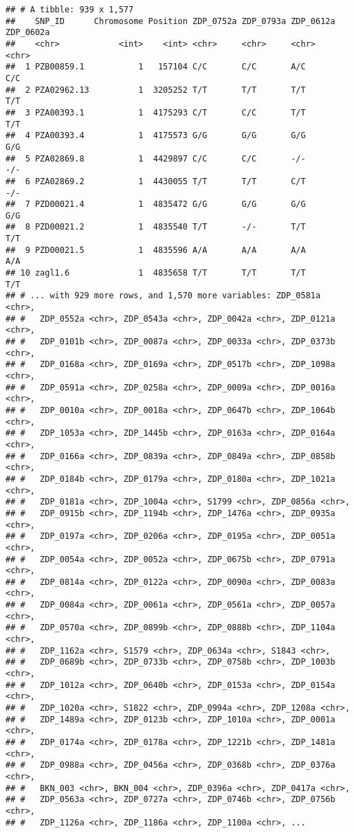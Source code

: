 \documentclass[]{article}
\begin{document}
\begin{verbatim}
## # A tibble: 939 x 1,577
##    SNP_ID      Chromosome Position ZDP_0752a ZDP_0793a ZDP_0612a ZDP_0602a
##    <chr>            <int>    <int> <chr>     <chr>     <chr>     <chr>    
##  1 PZB00859.1           1   157104 C/C       C/C       A/C       C/C      
##  2 PZA02962.13          1  3205252 T/T       T/T       T/T       T/T      
##  3 PZA00393.1           1  4175293 C/T       C/C       T/T       T/T      
##  4 PZA00393.4           1  4175573 G/G       G/G       G/G       G/G      
##  5 PZA02869.8           1  4429897 C/C       C/C       -/-       -/-      
##  6 PZA02869.2           1  4430055 T/T       T/T       C/T       -/-      
##  7 PZD00021.4           1  4835472 G/G       G/G       G/G       G/G      
##  8 PZD00021.2           1  4835540 T/T       -/-       T/T       T/T      
##  9 PZD00021.5           1  4835596 A/A       A/A       A/A       A/A      
## 10 zagl1.6              1  4835658 T/T       T/T       T/T       T/T      
## # ... with 929 more rows, and 1,570 more variables: ZDP_0581a <chr>,
## #   ZDP_0552a <chr>, ZDP_0543a <chr>, ZDP_0042a <chr>, ZDP_0121a <chr>,
## #   ZDP_0101b <chr>, ZDP_0087a <chr>, ZDP_0033a <chr>, ZDP_0373b <chr>,
## #   ZDP_0168a <chr>, ZDP_0169a <chr>, ZDP_0517b <chr>, ZDP_1098a <chr>,
## #   ZDP_0591a <chr>, ZDP_0258a <chr>, ZDP_0009a <chr>, ZDP_0016a <chr>,
## #   ZDP_0010a <chr>, ZDP_0018a <chr>, ZDP_0647b <chr>, ZDP_1064b <chr>,
## #   ZDP_1053a <chr>, ZDP_1445b <chr>, ZDP_0163a <chr>, ZDP_0164a <chr>,
## #   ZDP_0166a <chr>, ZDP_0839a <chr>, ZDP_0849a <chr>, ZDP_0858b <chr>,
## #   ZDP_0184b <chr>, ZDP_0179a <chr>, ZDP_0180a <chr>, ZDP_1021a <chr>,
## #   ZDP_0181a <chr>, ZDP_1004a <chr>, S1799 <chr>, ZDP_0856a <chr>,
## #   ZDP_0915b <chr>, ZDP_1194b <chr>, ZDP_1476a <chr>, ZDP_0935a <chr>,
## #   ZDP_0197a <chr>, ZDP_0206a <chr>, ZDP_0195a <chr>, ZDP_0051a <chr>,
## #   ZDP_0054a <chr>, ZDP_0052a <chr>, ZDP_0675b <chr>, ZDP_0791a <chr>,
## #   ZDP_0814a <chr>, ZDP_0122a <chr>, ZDP_0090a <chr>, ZDP_0083a <chr>,
## #   ZDP_0084a <chr>, ZDP_0061a <chr>, ZDP_0561a <chr>, ZDP_0057a <chr>,
## #   ZDP_0570a <chr>, ZDP_0899b <chr>, ZDP_0888b <chr>, ZDP_1104a <chr>,
## #   ZDP_1162a <chr>, S1579 <chr>, ZDP_0634a <chr>, S1843 <chr>,
## #   ZDP_0689b <chr>, ZDP_0733b <chr>, ZDP_0758b <chr>, ZDP_1003b <chr>,
## #   ZDP_1012a <chr>, ZDP_0640b <chr>, ZDP_0153a <chr>, ZDP_0154a <chr>,
## #   ZDP_1020a <chr>, S1822 <chr>, ZDP_0994a <chr>, ZDP_1208a <chr>,
## #   ZDP_1489a <chr>, ZDP_0123b <chr>, ZDP_1010a <chr>, ZDP_0001a <chr>,
## #   ZDP_0174a <chr>, ZDP_0178a <chr>, ZDP_1221b <chr>, ZDP_1481a <chr>,
## #   ZDP_0988a <chr>, ZDP_0456a <chr>, ZDP_0368b <chr>, ZDP_0376a <chr>,
## #   BKN_003 <chr>, BKN_004 <chr>, ZDP_0396a <chr>, ZDP_0417a <chr>,
## #   ZDP_0563a <chr>, ZDP_0727a <chr>, ZDP_0746b <chr>, ZDP_0756b <chr>,
## #   ZDP_1126a <chr>, ZDP_1186a <chr>, ZDP_1100a <chr>, ...
\end{verbatim}
\end{document}

